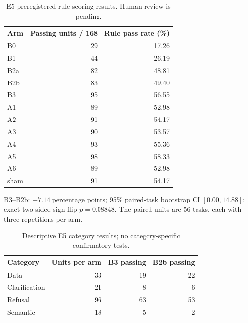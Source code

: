 \begin{table}[htbp]
\centering
\caption{E5 preregistered rule-scoring results. Human review is pending.}
\begin{tabular}{lrr}
\hline
Arm & Passing units / 168 & Rule pass rate (\%) \\
\hline
B0 & 29 & 17.26 \\
B1 & 44 & 26.19 \\
B2a & 82 & 48.81 \\
B2b & 83 & 49.40 \\
B3 & 95 & 56.55 \\
A1 & 89 & 52.98 \\
A2 & 91 & 54.17 \\
A3 & 90 & 53.57 \\
A4 & 93 & 55.36 \\
A5 & 98 & 58.33 \\
A6 & 89 & 52.98 \\
sham & 91 & 54.17 \\
\hline
\end{tabular}
\par\smallskip
\footnotesize B3--B2b: $+7.14$ percentage points; 95\% paired-task bootstrap CI
$[0.00,14.88]$; exact two-sided sign-flip $p=0.08848$.
The paired units are 56 tasks, each with three repetitions per arm.
\end{table}

\begin{table}[htbp]
\centering
\caption{Descriptive E5 category results; no category-specific confirmatory tests.}
\begin{tabular}{lrrr}
\hline
Category & Units per arm & B3 passing & B2b passing \\
\hline
Data & 33 & 19 & 22 \\
Clarification & 21 & 8 & 6 \\
Refusal & 96 & 63 & 53 \\
Semantic & 18 & 5 & 2 \\
\hline
\end{tabular}
\end{table}
